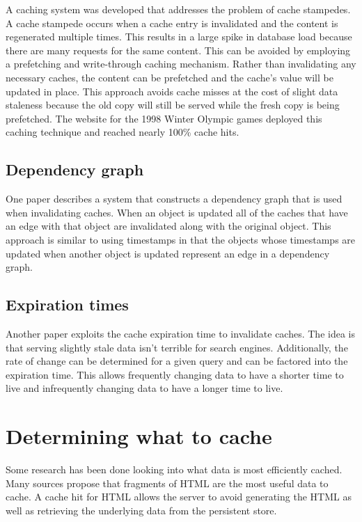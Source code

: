 \documentclass[12pt]{article}
\begin{document}
A caching system was developed that addresses the problem of cache stampedes.\cite{scalableConsistentCaching}
A cache stampede occurs when a cache entry is invalidated and the content is regenerated multiple times.
This results in a large spike in database load because there are many requests for the same content.
This can be avoided by employing a prefetching and write-through caching mechanism.
Rather than invalidating any necessary caches, the content can be prefetched and the cache's value will be updated in place.
This approach avoids cache misses at the cost of slight data staleness because the old copy will still be served while the fresh copy is being prefetched.
The website for the 1998 Winter Olympic games deployed this caching technique and reached nearly 100\% cache hits.\cite{scalableConsistentCaching}

\subsection{Dependency graph}
One paper describes a system that constructs a dependency graph that is used when invalidating caches.\cite{scalableConsistentCaching}
When an object is updated all of the caches that have an edge with that object are invalidated along with the original object.
This approach is similar to using timestamps in that the objects whose timestamps are updated when another object is updated represent an edge in a dependency graph.

\subsection{Expiration times}
Another paper exploits the cache expiration time to invalidate caches.\cite{refreshingPerspectiveSearch}
The idea is that serving slightly stale data isn't terrible for search engines.
Additionally, the rate of change can be determined for a given query and can be factored into the expiration time.
This allows frequently changing data to have a shorter time to live and infrequently changing data to have a longer time to live.

\section{Determining what to cache}
Some research has been done looking into what data is most efficiently cached.
Many sources propose that fragments of HTML are the most useful data to cache.\cite{comparisonOfCachingSolutions}\cite{scalableConsistentCaching}
A cache hit for HTML allows the server to avoid generating the HTML as well as retrieving the underlying data from the persistent store.\cite{howBasecampGotSoFast}
\end{document}

